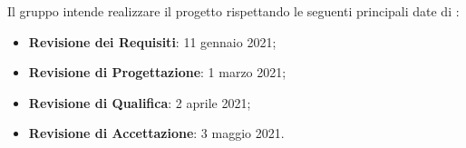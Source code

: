 Il gruppo \Gruppo{} intende realizzare il progetto \NomeProgetto{} rispettando le seguenti principali date di :
\begin{itemize}
    \item \textbf{Revisione dei Requisiti}: 11 gennaio 2021;
    \item \textbf{Revisione di Progettazione}: 1 marzo 2021;
    \item \textbf{Revisione di Qualifica}: 2 aprile 2021;
    \item \textbf{Revisione di Accettazione}: 3 maggio 2021.
\end{itemize}